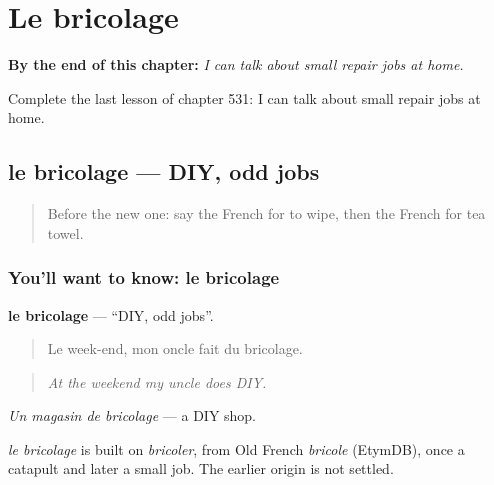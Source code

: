 
\chapter{Le bricolage}
\label{ch:fr-le-bricolage}

\begin{chapteropening}
\textbf{By the end of this chapter:} \emph{I can talk about small repair jobs at home.}

Complete the last lesson of chapter 531: I can talk about small repair jobs at home.
\end{chapteropening}

\section[le bricolage]{le bricolage — DIY, odd jobs}

\label{lesson:FR-C531-bricolage}



\begin{quote}
Before the new one: say the French for to wipe, then the French for tea towel.
\end{quote}

\subsection*{You'll want to know: le bricolage}
\textbf{le bricolage} — \textquotedblleft{}DIY, odd jobs\textquotedblright{}.

\begin{quote}
Le week-end, mon oncle fait du bricolage.
\end{quote}

\begin{quote}
\emph{At the weekend my uncle does DIY.}
\end{quote}

\emph{Un magasin de bricolage} — a DIY shop.

\begin{cousinweb}
\emph{le bricolage} is built on \emph{bricoler}, from Old French \emph{bricole} (EtymDB), once a catapult and later a small job. The earlier origin is not settled.
\end{cousinweb}

